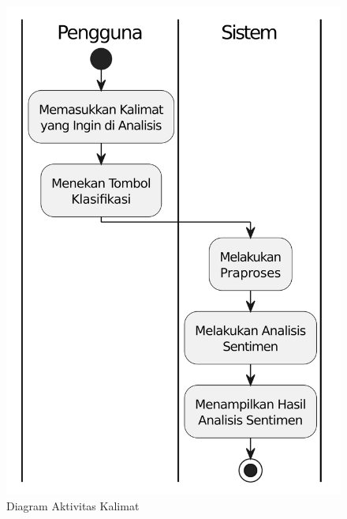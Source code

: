 \begin{figure}[H]
  \centering
  \includegraphics[scale=0.7]{assets/activity_diagram_kalimat.png}
  \caption{Diagram Aktivitas Kalimat}
  \label{fig:activity_diagram_kalimat}
\end{figure}


